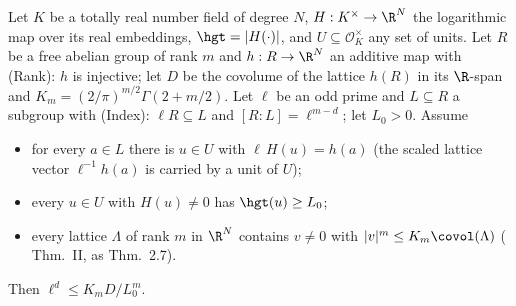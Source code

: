 Let $K$ be a totally real number field of degree $N$, $H:K^\times\to\R^N$ the logarithmic map over its real embeddings, $\hgt=|H(\cdot)|$, and $U\subseteq\mathcal O_K^\times$ any set of units. Let $R$ be a free abelian group of rank $m$ and $h:R\to\R^N$ an additive map with (Rank): $h$ is injective; let $D$ be the covolume of the lattice $h(R)$ in its $\R$-span and $K_m=(2/\pi)^{m/2}\Gamma(2+m/2)$. Let $\ell$ be an odd prime and $L\subseteq R$ a subgroup with (Index): $\ell R\subseteq L$ and $[R:L]=\ell^{m-d}$; let $L_0>0$. Assume
\begin{itemize}
\item[(Car)] for every $a\in L$ there is $u\in U$ with $\ell\,H(u)=h(a)$ (the scaled lattice vector $\ell^{-1}h(a)$ is carried by a unit of $U$);
\item[(Floor)] every $u\in U$ with $H(u)\ne0$ has $\hgt(u)\ge L_0$;
\item[(Bl)] every lattice $\Lambda$ of rank $m$ in $\R^N$ contains $v\ne0$ with $|v|^m\le K_m\covol(\Lambda)$ (\cite{Bl14} Thm.~II, as \cite{MO16} Thm.~2.7).
\end{itemize}
Then $\ell^{d}\le K_mD/L_0^{m}$.
